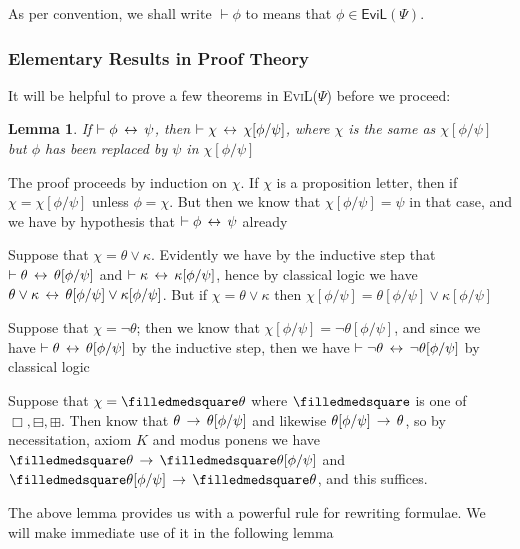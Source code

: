 \documentclass[11pt]{article}
\newtheorem{lemma}[theorem]{Lemma}
\newcommand{\BB}{\boxminus}
\newcommand{\BBI}{\boxplus}
\newcommand{\BlackBox}{\filledmedsquare}
\begin{document}
As per convention, we shall write $\vdash \phi$ to means that $\phi \in \mathsf{EviL}(\Psi)$.

\subsubsection{Elementary Results in Proof Theory}
It will be helpful to prove a few theorems in \textsc{EviL}($\Psi$) before we proceed:

\begin{lemma}
	If $\vdash \phi \,\leftrightarrow\, \psi$, then $\vdash \chi \,\leftrightarrow\, \chi[\phi/\psi]$, where $\chi$ is the same as $\chi[\phi/\psi]$ but $\phi$ has been replaced by $\psi$ in $\chi[\phi/\psi]$
\end{lemma}
\begin{peano}
	\item The proof proceeds by induction on $\chi$.  If $\chi$ is a proposition letter, then if $\chi = \chi[\phi/\psi]$ unless $\phi = \chi$.  But then we know that $\chi[\phi/\psi] = \psi$ in that case, and we have by hypothesis that $\vdash \phi \,\leftrightarrow\, \psi$ already
	\item Suppose that $\chi = \theta \vee \kappa$.  Evidently we have by the inductive step that $\vdash \theta \,\leftrightarrow\, \theta[\phi/\psi]$ and $\vdash \kappa \,\leftrightarrow\, \kappa[\phi/\psi]$, hence by classical logic we have $\theta \vee \kappa \,\leftrightarrow\, \theta[\phi/\psi] \vee \kappa[\phi/\psi]$.  But if $\chi = \theta \vee \kappa$ then $\chi[\phi/\psi] = \theta[\phi/\psi] \vee \kappa[\phi/\psi]$
	\item Suppose that $\chi = \neg \theta$; then we know that $\chi[\phi/\psi] = \neg \theta[\phi/\psi]$, and since we have $\vdash \theta \,\leftrightarrow\, \theta[\phi/\psi]$ by the inductive step, then we have $\vdash \neg \theta \,\leftrightarrow\, \neg \theta[\phi/\psi]$ by classical logic
	\item Suppose that $\chi = \BlackBox \theta$ where $\BlackBox$ is one of $\Box, \BB, \BBI$.  Then know that $\theta \,\rightarrow\, \theta[\phi/\psi]$ and likewise $\theta[\phi/\psi] \,\rightarrow\, \theta$, so by necessitation, axiom $K$ and modus ponens we have $\BlackBox\theta \IMPL \BlackBox\theta[\phi/\psi]$ and $\BlackBox\theta[\phi/\psi] \IMPL \BlackBox\theta$, and this suffices.
\end{peano}

The above lemma provides us with a powerful rule for rewriting formulae.  We will make immediate use of it in the following lemma
\end{document}
